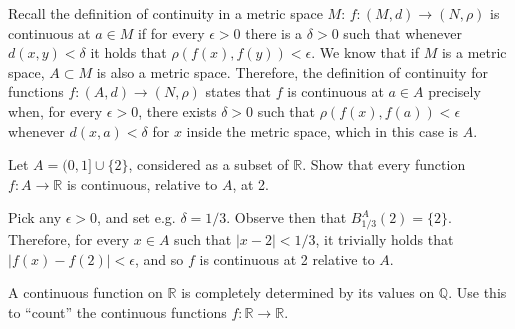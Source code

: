 \begin{solution}
    
    Recall the definition of continuity in a metric space $M$: $f: (M, d) \rightarrow (N, \rho)$ is continuous at $a \in M$ if for every $\epsilon > 0$ there is a $\delta > 0$ such that whenever $d(x, y) < \delta$ it holds that $\rho(f(x), f(y)) < \epsilon$.
    We know that if $M$ is a metric space, $A \subset M$ is also a metric space.
    Therefore, the definition of continuity for functions $f: (A, d) \rightarrow (N, \rho)$ states that $f$ is continuous at $a \in A$ precisely when, for every $\epsilon > 0$, there exists $\delta > 0$ such that $\rho(f(x), f(a)) < \epsilon$ whenever $d(x, a) < \delta$ for $x$ inside the metric space, which in this case is $A$.
\end{solution}

\begin{exercise}{10}
    Let $A = (0, 1] \cup \{2\}$, considered as a subset of $\mathbb{R}$.
    Show that every function $f: A \rightarrow \mathbb{R}$ is continuous, relative to $A$, at 2.
\end{exercise}

\begin{solution}
    
    Pick any $\epsilon > 0$, and set e.g. $\delta = 1/3$.
    Observe then that $B_{1/3}^{A}(2) = \{2\}$.
    Therefore, for every $x \in A$ such that $\lvert x - 2 \rvert < 1/3$, it trivially holds that $\lvert f(x) - f(2) \rvert < \epsilon$, and so $f$ is continuous at 2 relative to $A$.
\end{solution}

\begin{exercise}{14}
    A continuous function on $\mathbb{R}$ is completely determined by its values on $\mathbb{Q}$.
    Use this to ``count'' the continuous functions $f: \mathbb{R} \rightarrow \mathbb{R}$.
\end{exercise}

